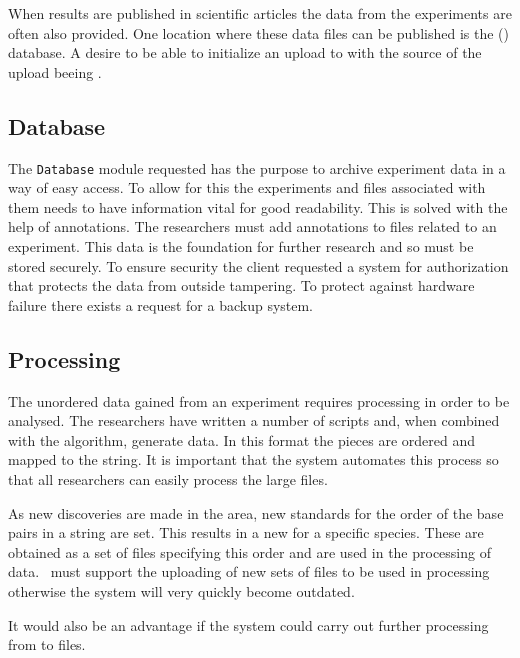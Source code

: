 When results are published in scientific articles the  data from the experiments are often also provided. One location where these  data files can be published is the  () database. A desire to be able to initialize an upload to \appName with the source of the upload beeing  .


\subsection{Database}
The \texttt{Database} module requested has the purpose to archive experiment data in a way of easy access. To allow for this the experiments and files associated with them needs to have information vital for good readability. This is solved with the help of annotations. The researchers must add annotations to files related to an experiment.
This data is the foundation for further research and so must be stored securely. To ensure security the client requested a system for authorization that protects the data from outside tampering. To protect against hardware failure there exists a request for a backup system.

\subsection{Processing}
The unordered  data gained from an experiment requires processing in order to be analysed. The researchers have written a number of scripts and, when combined with the  algorithm, generate  data. In this format the  pieces are ordered and mapped to the  string. It is important that the system automates this process so that all researchers can easily process the large  files.

As new discoveries are made in the area, new standards for the order of the base pairs in a  string are set. This results in a new  for a specific species. These are obtained as a set of files specifying this order and are used in the processing of  data. \appName\ must support the uploading of new sets of  files to be used in processing otherwise the system will very quickly become outdated. 

It would also be an advantage if the system could carry out further processing from  to  files.

